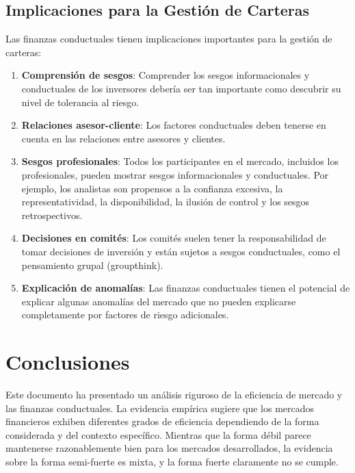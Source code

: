 \subsection{Implicaciones para la Gestión de Carteras}

Las finanzas conductuales tienen implicaciones importantes para la gestión de carteras:

\begin{enumerate}
\item \textbf{Comprensión de sesgos}: Comprender los sesgos informacionales y conductuales de los inversores debería ser tan importante como descubrir su nivel de tolerancia al riesgo.

\item \textbf{Relaciones asesor-cliente}: Los factores conductuales deben tenerse en cuenta en las relaciones entre asesores y clientes.

\item \textbf{Sesgos profesionales}: Todos los participantes en el mercado, incluidos los profesionales, pueden mostrar sesgos informacionales y conductuales. Por ejemplo, los analistas son propensos a la confianza excesiva, la representatividad, la disponibilidad, la ilusión de control y los sesgos retrospectivos.

\item \textbf{Decisiones en comités}: Los comités suelen tener la responsabilidad de tomar decisiones de inversión y están sujetos a sesgos conductuales, como el pensamiento grupal (groupthink).

\item \textbf{Explicación de anomalías}: Las finanzas conductuales tienen el potencial de explicar algunas anomalías del mercado que no pueden explicarse completamente por factores de riesgo adicionales.
\end{enumerate}

\section{Conclusiones}

Este documento ha presentado un análisis riguroso de la eficiencia de mercado y las finanzas conductuales. La evidencia empírica sugiere que los mercados financieros exhiben diferentes grados de eficiencia dependiendo de la forma considerada y del contexto específico. Mientras que la forma débil parece mantenerse razonablemente bien para los mercados desarrollados, la evidencia sobre la forma semi-fuerte es mixta, y la forma fuerte claramente no se cumple.

